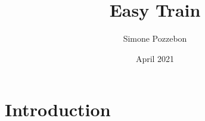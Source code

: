 \documentclass{article}
\title{Easy Train}
\author{Simone Pozzebon}
\date{April 2021}
\begin{document}
\maketitle

\section{Introduction}
\end{document}
